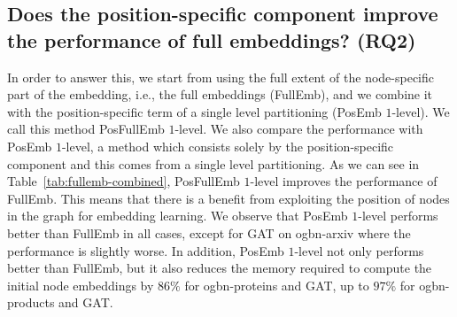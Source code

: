 \documentclass[conference]{IEEEtran}
\begin{document}
\subsection{Does the position-specific component improve the performance of full embeddings? (RQ2)}
In order to answer this, we start from using the full extent of the node-specific part of the embedding, i.e., the full embeddings (FullEmb), and we combine it with the position-specific term of a single level partitioning (PosEmb $1$-level). We call this method PosFullEmb $1$-level. 
We also compare the performance with PosEmb $1$-level, a method which consists solely by the position-specific component and this comes from a single level partitioning. As we can see in Table~\ref{tab:fullemb-combined}, PosFullEmb $1$-level improves the performance of FullEmb. This means that there is a benefit from exploiting the position of nodes in the graph for embedding learning. We observe that PosEmb $1$-level performs better than FullEmb in all cases, except for GAT on ogbn-arxiv where the performance is slightly worse. In addition, PosEmb $1$-level not only performs better than FullEmb, but it also reduces the memory required to compute the initial node embeddings by $86\%$ for ogbn-proteins and GAT, up to $97\%$ for ogbn-products and GAT. 
\end{document}
